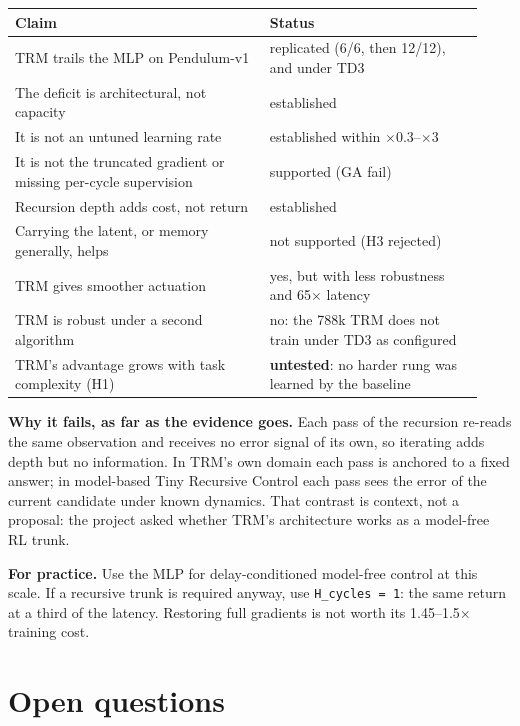 \documentclass[11pt]{article}
\begin{document}
\begin{center}\small\begin{tabular}{>{\raggedright\arraybackslash}p{0.506\linewidth}>{\raggedright\arraybackslash}p{0.428\linewidth}}
\toprule
Claim & Status \\
\midrule
TRM trails the MLP on Pendulum-v1 & replicated (6/6, then 12/12), and under TD3 \\
The deficit is architectural, not capacity & established \\
It is not an untuned learning rate & established within $\times$0.3--$\times$3 \\
It is not the truncated gradient or missing per-cycle supervision & supported (GA fail) \\
Recursion depth adds cost, not return & established \\
Carrying the latent, or memory generally, helps & not supported (H3 rejected) \\
TRM gives smoother actuation & yes, but with less robustness and 65$\times$ latency \\
TRM is robust under a second algorithm & no: the 788k TRM does not train under TD3 as configured \\
TRM's advantage grows with task complexity (H1) & \textbf{untested}: no harder rung was learned by the baseline \\
\bottomrule
\end{tabular}\end{center}



\textbf{Why it fails, as far as the evidence goes.} Each pass of the recursion re-reads the same observation and receives no error signal of its own, so iterating adds depth but no information. In TRM's own domain each pass is anchored to a fixed answer; in model-based Tiny Recursive Control each pass sees the error of the current candidate under known dynamics. That contrast is context, not a proposal: the project asked whether TRM's architecture works as a model-free RL trunk.



\textbf{For practice.} Use the MLP for delay-conditioned model-free control at this scale. If a recursive trunk is required anyway, use \texttt{H\_cycles = 1}: the same return at a third of the latency. Restoring full gradients is not worth its 1.45--1.5$\times$ training cost.



\section*{Open questions}
\end{document}
